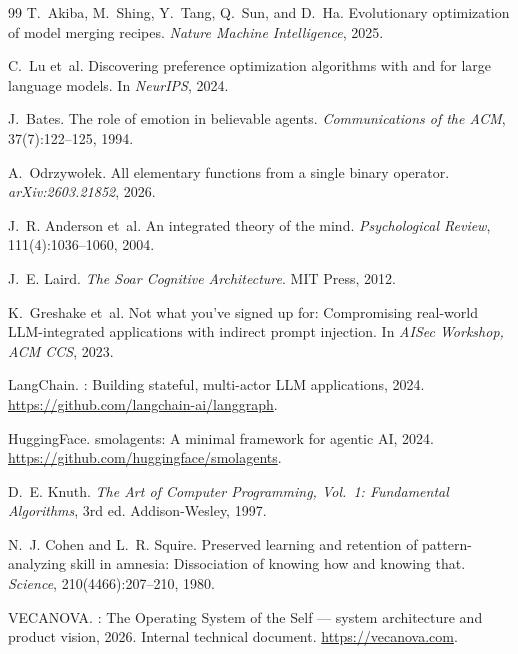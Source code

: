 \documentclass[12pt,a4paper]{article}
\begin{document}
\begin{thebibliography}{99}
T.~Akiba, M.~Shing, Y.~Tang, Q.~Sun, and D.~Ha.
\newblock Evolutionary optimization of model merging recipes.
\newblock \emph{Nature Machine Intelligence}, 2025.

C.~Lu et~al.
\newblock Discovering preference optimization algorithms with and for large
  language models.
\newblock In \emph{NeurIPS}, 2024.

J.~Bates.
\newblock The role of emotion in believable agents.
\newblock \emph{Communications of the ACM}, 37(7):122--125, 1994.

A.~Odrzyw{o\l}ek.
\newblock All elementary functions from a single binary operator.
\newblock \emph{arXiv:2603.21852}, 2026.

J.~R. Anderson et~al.
\newblock An integrated theory of the mind.
\newblock \emph{Psychological Review}, 111(4):1036--1060, 2004.

J.~E. Laird.
\newblock \emph{The {S}oar Cognitive Architecture}.
\newblock MIT Press, 2012.

K.~Greshake et~al.
\newblock Not what you've signed up for: Compromising real-world
  {LLM}-integrated applications with indirect prompt injection.
\newblock In \emph{AISec Workshop, ACM CCS}, 2023.

LangChain.
: Building stateful, multi-actor {LLM} applications, 2024.
\newblock \url{https://github.com/langchain-ai/langgraph}.

HuggingFace.
\newblock smolagents: A minimal framework for agentic {AI}, 2024.
\newblock \url{https://github.com/huggingface/smolagents}.

D.~E. Knuth.
\newblock \emph{The Art of Computer Programming, Vol.\ 1: Fundamental
  Algorithms}, 3rd ed.
\newblock Addison-Wesley, 1997.

N.~J. Cohen and L.~R. Squire.
\newblock Preserved learning and retention of pattern-analyzing skill in
  amnesia: Dissociation of knowing how and knowing that.
\newblock \emph{Science}, 210(4466):207--210, 1980.

VECANOVA.
: The Operating System of the Self --- system architecture
  and product vision, 2026.
\newblock Internal technical document. \url{https://vecanova.com}.

\end{thebibliography}
\end{document}
